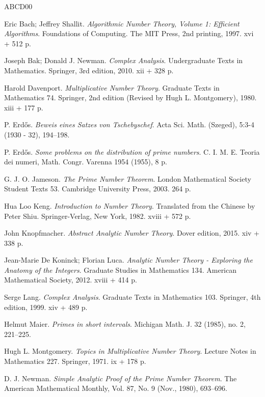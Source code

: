 \documentclass[11pt]{amsart}
\numberwithin{equation}{section}
\begin{document}
\begin{thebibliography}{ABCD00}

 Eric Bach; Jeffrey Shallit. {\em Algorithmic Number Theory, Volume 1: Efficient Algorithms}. Foundations of Computing. The MIT Press, 2nd printing, 1997. xvi + 512 p.

 Joseph Bak; Donald J. Newman. {\em Complex Analysis}. Undergraduate Texts in Mathematics. Springer, 3rd edition, 2010. xii + 328 p.

 Harold Davenport. {\em Multiplicative Number Theory}. Graduate Texts in Mathematics 74. Springer, 2nd edition (Revised by Hugh L. Montgomery), 1980. xiii + 177 p.

 P. Erd\H{o}s. {\em Beweis eines Satzes von Tschebyschef}. Acta Sci. Math. (Szeged), 5:3-4 (1930 - 32), 194--198.

 P. Erd\H{o}s. {\em Some problems on the distribution of prime numbers}. C. I. M. E. Teoria dei numeri, Math. Congr. Varenna 1954 (1955), 8 p.

 G. J. O. Jameson. {\em The Prime Number Theorem}. London Mathematical Society Student Texts 53. Cambridge University Press, 2003. 264 p.

 Hua Loo Keng. {\em Introduction to Number Theory}. Translated from the Chinese by Peter Shiu. Springer-Verlag, New York, 1982. xviii + 572 p.

 John Knopfmacher. {\em Abstract Analytic Number Theory}. Dover edition, 2015. xiv + 338 p.

 Jean-Marie De Koninck; Florian Luca. {\em Analytic Number Theory - Exploring the Anatomy of the Integers}. Graduate Studies in Mathematics 134. American Mathematical Society, 2012. xviii + 414 p.

 Serge Lang. {\em Complex Analysis}. Graduate Texts in Mathematics 103. Springer, 4th edition, 1999. xiv + 489 p.

 Helmut Maier. {\em Primes in short intervals}. Michigan Math. J. 32 (1985), no. 2, 221--225. 

 Hugh L. Montgomery. {\em Topics in Multiplicative Number Theory}. Lecture Notes in Mathematics 227. Springer, 1971. ix + 178 p.

 D. J. Newman. {\em Simple Analytic Proof of the Prime Number Theorem}. The American Mathematical Monthly, Vol. 87, No. 9 (Nov., 1980), 693--696.


\end{thebibliography}
\end{document}
